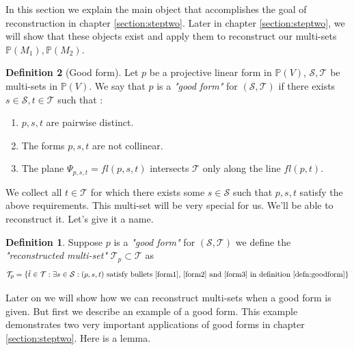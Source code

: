 \documentclass[12pt]{caltech_thesis}
\theoremstyle{plain}
\theoremstyle{definition}
\newtheorem{definition}{Definition}
\newcommand{\MS}{\mathcal{S}}
\newcommand{\MT}{\mathcal{T}}
\newcommand{\PP}{\mathbb{P}}
\begin{document}
In this section we explain the main object that accomplishes the goal of reconstruction in chapter \ref{section:steptwo}.
 Later in chapter \ref{section:steptwo}, we will show that these objects exist and apply them to reconstruct our multi-sets
$\PP(M_1),\PP(M_2)$.


\begin{definition} [Good form] \label{defn:goodform}
Let $p$ be a projective linear form in $\PP(V)$, $\MS, \MT$ be multi-sets in $\PP(V)$. We say that $p$ is a
\emph{"good form"} for $(\MS,\MT)$ if there exists $s \in \MS, t\in \MT$ such that :
 \begin{enumerate}
 \item \label{form1}$p,s,t$ are pairwise distinct.
 \item \label{form2}The forms $p,s,t$ are not collinear.
 \item \label{form3}The plane $\Psi_{p,s,t} = fl(p,s,t)$ intersects $\MT$ only along the line $fl(p,t)$.
 \end{enumerate}

 We collect all $t\in \MT$ for which there exists some $s\in \MS$ such that $p,s,t$ satisfy the above requirements. This multi-set
 will be very special for us. We'll be able to reconstruct it. Let's give it a name.


 \begin{definition}\label{defn:reconstructedset}
 Suppose $p$ is a \emph{"good form"} for $(\MS,\MT)$ we define the \emph{"reconstructed multi-set"} $\MT_p\subset \MT$ as
 \[
 \MT_p = \{\tilde t\in \MT : \exists s \in \MS : (p,s,t)\text{ satisfy bullets \ref{form1}, \ref{form2} and \ref{form3} 
 in definition \ref{defn:goodform}}\}
 \]
 \end{definition}



\end{definition}

Later on we will show how we can reconstruct multi-sets when a good form is given. But first we describe an example of a good form.
This example demonstrates two very important applications of good forms in chapter \ref{section:steptwo}. Here is a lemma.
\end{document}
